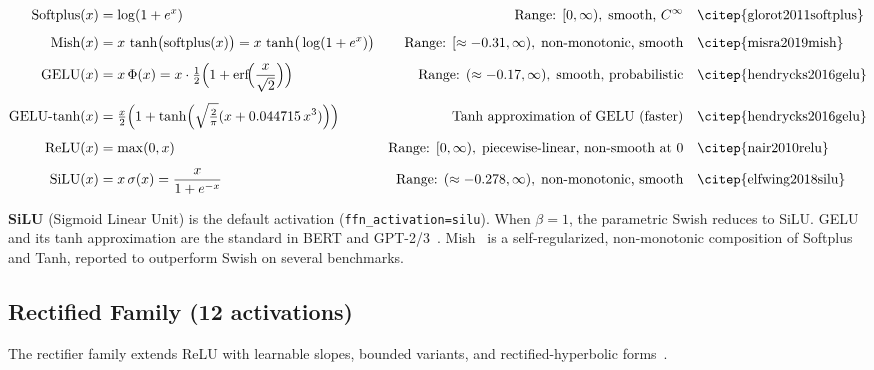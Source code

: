 {\scriptsize
\begin{align}
  \text{Softplus}(x) &= \log(1+e^{x})
    & \text{Range: } [0,\infty),\;\text{smooth, }C^\infty
    & \quad \text{\citep{glorot2011softplus}} \\[4pt]
  \text{Mish}(x) &= x\,\tanh\!\big(\text{softplus}(x)\big)
    = x\,\tanh\!\big(\log(1+e^{x})\big)
    & \text{Range: } [\approx{-0.31},\infty),\;\text{non-monotonic, smooth}
    & \quad \text{\citep{misra2019mish}} \\[4pt]
  \text{GELU}(x) &= x\,\Phi(x) = x\cdot\tfrac{1}{2}\Big(1+\text{erf}\!\Big(\frac{x}{\sqrt{2}}\Big)\Big)
    & \text{Range: } (\approx{-0.17},\infty),\;\text{smooth, probabilistic}
    & \quad \text{\citep{hendrycks2016gelu}} \\[4pt]
  \text{GELU-tanh}(x) &= \tfrac{x}{2}\Big(1+\tanh\!\Big(\sqrt{\tfrac{2}{\pi}}
    (x+0.044715\,x^{3})\Big)\Big)
    & \text{Tanh approximation of GELU (faster)}
    & \quad \text{\citep{hendrycks2016gelu}} \\[4pt]
  \text{ReLU}(x) &= \max(0,x)
    & \text{Range: } [0,\infty),\;\text{piecewise-linear, non-smooth at 0}
    & \quad \text{\citep{nair2010relu}} \\[4pt]
  \text{SiLU}(x) &= x\,\sigma(x) = \frac{x}{1+e^{-x}}
    & \text{Range: } (\approx{-0.278},\infty),\;\text{non-monotonic, smooth}
    & \quad \text{\citep{elfwing2018silu}}
\end{align}
}  %

\noindent\textbf{SiLU} (Sigmoid Linear Unit) is the default activation
(\texttt{ffn\_activation=silu}). When $\beta=1$, the parametric Swish reduces
to SiLU. GELU and its tanh approximation are the standard in BERT and
GPT-2/3~\citep{hendrycks2016gelu}. Mish~\citep{misra2019mish} is a
self-regularized, non-monotonic composition of Softplus and Tanh, reported to
outperform Swish on several benchmarks.

\subsection{Rectified Family (12 activations)}

The rectifier family extends ReLU with learnable slopes, bounded variants, and
rectified-hyperbolic forms~\citep{nair2010relu,dubey2021activations}.

